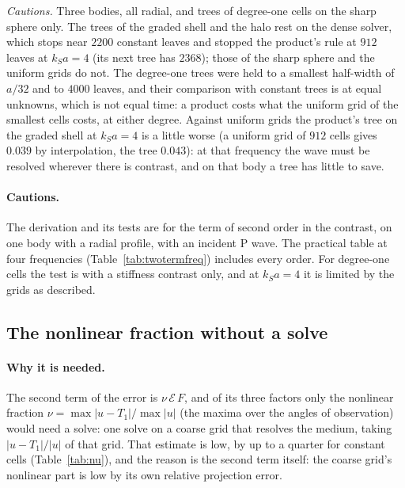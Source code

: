 \documentclass[11pt,a4paper]{article}
\newcommand{\cE}{\mathcal{E}}
\begin{document}
\emph{Cautions.} Three bodies, all radial, and trees of degree-one cells on the sharp sphere only. The trees of the graded
shell and the halo rest on the dense solver, which stops near $2200$ constant leaves and stopped the
product's rule at $912$ leaves at $k_Sa=4$ (its next tree has $2368$); those of the sharp sphere and the
uniform grids do not. The degree-one trees were held to a smallest half-width of $a/32$ and to $4000$
leaves, and their comparison with constant trees is at equal unknowns, which is not equal time: a
product costs what the uniform grid of the smallest cells costs, at either degree. Against
uniform grids the product's tree on the graded shell at $k_Sa=4$ is a little worse (a uniform grid of
$912$ cells gives $0.039$ by interpolation, the tree $0.043$): at that frequency the wave must be
resolved wherever there is contrast, and on that body a tree has little to save.

\paragraph{Cautions.} The derivation and its tests are for the term of second order in the contrast, on
one body with a radial profile, with an incident P wave. The practical table at four frequencies
(Table~\ref{tab:twotermfreq}) includes every order. For degree-one cells the test is with a stiffness
contrast only, and at $k_Sa=4$ it is limited by the grids as described.

\subsection{The nonlinear fraction without a solve}\label{sec:nu}

\paragraph{Why it is needed.} The second term of the error is $\nu\,\cE\,F$, and of its three factors
only the nonlinear fraction $\nu=\max\lvert u-T_1\rvert/\max\lvert u\rvert$ (the maxima over the angles
of observation) would need a solve: one solve on a coarse grid that resolves the medium, taking
$\lvert u-T_1\rvert/\lvert u\rvert$ of that grid. That estimate is low, by up to a quarter for constant
cells (Table~\ref{tab:nu}), and the reason is the second term itself: the coarse grid's nonlinear part is
low by its own relative projection error.
\end{document}
